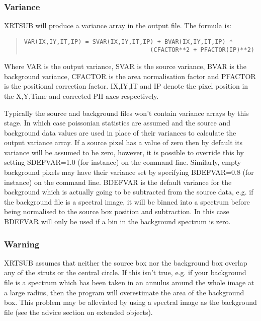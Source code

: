 \documentclass{book}
\renewcommand{\_}{{\tt\char'137}}     %
\begin{document}
\subsubsection{Variance}
XRTSUB will produce a variance array in the output file.
The formula is:
 
\begin{quote}\begin{verbatim}
VAR(IX,IY,IT,IP) = SVAR(IX,IY,IT,IP) + BVAR(IX,IY,IT,IP) *
                                   (CFACTOR**2 + PFACTOR(IP)**2)
\end{verbatim}\end{quote}
Where VAR is the output variance, SVAR is the source variance, BVAR is
the background variance, CFACTOR is the area normalisation factor and
PFACTOR is the positional correction factor. IX,IY,IT and IP denote the
pixel position in the X,Y,Time and corrected PH axes respectively.
 
Typically the source and background files won't contain variance arrays
by this stage. In which case poissonian statistics are assumed and the
source and background data values are used in place of their variances
to calculate the output variance array. If a source pixel has a value
of zero then by default its variance will be assumed to be zero, however,
it is possible to override this by setting
SDEFVAR=1.0 (for instance) on the command line. Similarly, empty
background pixels may have their variance set by specifying BDEFVAR=0.8
(for instance) on the command line. BDEFVAR is the default variance for
the background which is actually going to be subtracted from the source
data, e.g. if the background file is a spectral image, it will be binned
into a spectrum before being normalised to the source box position and
subtraction. In this case BDEFVAR will only be used if a bin in the
background spectrum is zero.
 
\subsubsection{Warning}
XRTSUB assumes that neither the source box nor the background box
overlap any of the struts or the central circle. If this isn't true,
e.g. if your background file is a spectrum which has been taken in
an annulus around the whole image at a large radius, then the program
will overestimate the area of the background box. This problem may
be alleviated by using a spectral image as the background file (see
the advice section on extended objects).
 
\end{document}
